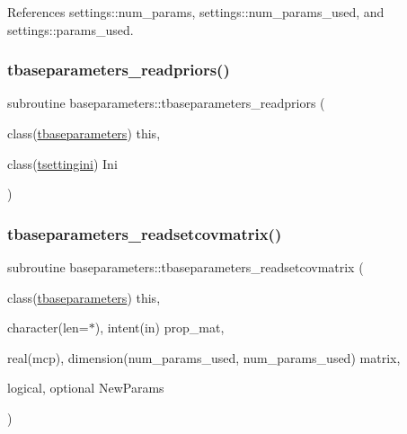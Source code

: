 References settings\+::num\+\_\+params, settings\+::num\+\_\+params\+\_\+used, and settings\+::params\+\_\+used.

\mbox{\label{namespacebaseparameters_a810df98da76d4ae9691fb72eb588ea34}} 
\subsubsection{\texorpdfstring{tbaseparameters\+\_\+readpriors()}{tbaseparameters\_readpriors()}}
{\footnotesize\ttfamily subroutine baseparameters\+::tbaseparameters\+\_\+readpriors (\begin{DoxyParamCaption}\item[{class(\mbox{\hyperlink{structbaseparameters_1_1tbaseparameters}{tbaseparameters}})}]{this,  }\item[{class(\mbox{\hyperlink{structsettings_1_1tsettingini}{tsettingini}})}]{Ini }\end{DoxyParamCaption})\hspace{0.3cm}{\ttfamily [private]}}

\mbox{\label{namespacebaseparameters_a2d0a5594063e754beb3d8ef2b4af0522}} 
\subsubsection{\texorpdfstring{tbaseparameters\+\_\+readsetcovmatrix()}{tbaseparameters\_readsetcovmatrix()}}
{\footnotesize\ttfamily subroutine baseparameters\+::tbaseparameters\+\_\+readsetcovmatrix (\begin{DoxyParamCaption}\item[{class(\mbox{\hyperlink{structbaseparameters_1_1tbaseparameters}{tbaseparameters}})}]{this,  }\item[{character(len=$\ast$), intent(in)}]{prop\+\_\+mat,  }\item[{real(mcp), dimension(num\+\_\+params\+\_\+used, num\+\_\+params\+\_\+used)}]{matrix,  }\item[{logical, optional}]{New\+Params }\end{DoxyParamCaption})\hspace{0.3cm}{\ttfamily [private]}}

